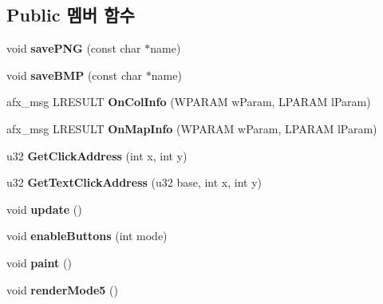 \subsection*{Public 멤버 함수}
\begin{DoxyCompactItemize}
\item 
\mbox{\label{class_map_view_afadc38148227210fd5d8e12c50e7f22d}} 
void {\bfseries save\+P\+NG} (const char $\ast$name)
\item 
\mbox{\label{class_map_view_a792d85841dc88e63ab7f31ed6de066d7}} 
void {\bfseries save\+B\+MP} (const char $\ast$name)
\item 
\mbox{\label{class_map_view_ae6fd15cfd77671946d4ad08f901bde3c}} 
afx\+\_\+msg L\+R\+E\+S\+U\+LT {\bfseries On\+Col\+Info} (W\+P\+A\+R\+AM w\+Param, L\+P\+A\+R\+AM l\+Param)
\item 
\mbox{\label{class_map_view_a9d5b068db40e4d9641bfeca9f81bb53a}} 
afx\+\_\+msg L\+R\+E\+S\+U\+LT {\bfseries On\+Map\+Info} (W\+P\+A\+R\+AM w\+Param, L\+P\+A\+R\+AM l\+Param)
\item 
\mbox{\label{class_map_view_ad05aa1227f5a62d8e9477eeeec37115c}} 
u32 {\bfseries Get\+Click\+Address} (int x, int y)
\item 
\mbox{\label{class_map_view_a30bef411235a6b8666f34991c2b90619}} 
u32 {\bfseries Get\+Text\+Click\+Address} (u32 base, int x, int y)
\item 
\mbox{\label{class_map_view_ac41eb53f60bccbfe4f5601f1a997c51e}} 
void {\bfseries update} ()
\item 
\mbox{\label{class_map_view_aad00c64b13ff280b4279a7f8cd57b083}} 
void {\bfseries enable\+Buttons} (int mode)
\item 
\mbox{\label{class_map_view_a89edf3053cffa4a68516178dbd987339}} 
void {\bfseries paint} ()
\item 
\mbox{\label{class_map_view_a8f6282ba1ec4a295b2fb33a41e541ba1}} 
void {\bfseries render\+Mode5} ()
\item 

\end{DoxyCompactItemize}
